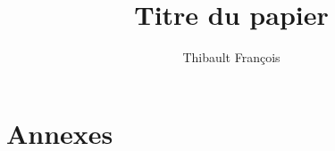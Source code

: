 \documentclass[a4paper,10pt]{report}
\begin{document}
\title  {Titre du papier}
\author  {Thibault François }
\maketitle
\tableofcontents  %







%


\label{Bibliographie}
\lhead{\nouppercase{\leftmark}}
 



\part*{Annexes}
\lhead{\nouppercase{\leftmark}}
\appendix %





\end{document}

